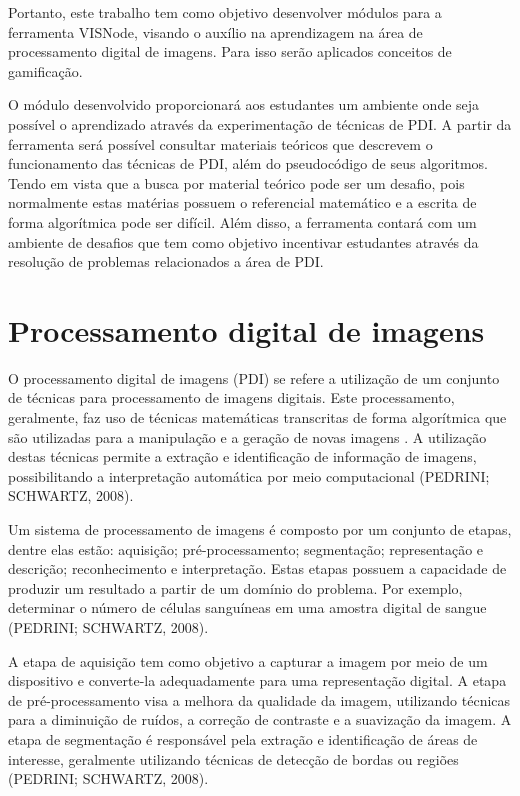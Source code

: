 \documentclass[
	12pt,				%
	oneside,			%
	a4paper,			%
	english,			%
	french,				%
	spanish,			%
	brazil,				%
	]{abntex2}
\begin{document}
Portanto, este trabalho tem como objetivo desenvolver módulos para a ferramenta VISNode, visando o auxílio na aprendizagem na área de processamento digital de imagens. Para isso serão aplicados conceitos de gamificação. 

O módulo desenvolvido proporcionará aos estudantes um ambiente onde seja possível o aprendizado através da experimentação de técnicas de PDI. A partir da ferramenta será possível consultar materiais teóricos que descrevem o funcionamento das técnicas de PDI, além do pseudocódigo de seus algoritmos. Tendo em vista que a busca por material teórico pode ser um desafio, pois normalmente estas matérias possuem o referencial matemático e a escrita de forma algorítmica pode ser difícil. Além disso, a ferramenta contará com um ambiente de desafios que tem como objetivo incentivar estudantes através da resolução de problemas relacionados a área de PDI.

\chapter{Processamento digital de imagens}

O  processamento digital de imagens (PDI) se refere a utilização de um conjunto de técnicas para processamento de imagens digitais. Este processamento, geralmente, faz uso de técnicas matemáticas transcritas de forma algorítmica que são utilizadas para a manipulação e a geração de novas imagens \cite{gonzalesWoods:2008}. A utilização destas técnicas permite a extração e identificação de informação de imagens, possibilitando a interpretação automática por meio computacional (PEDRINI; SCHWARTZ, 2008).

Um sistema de processamento de imagens é composto por um conjunto de etapas, dentre elas estão: aquisição; pré-processamento; segmentação; representação e descrição; reconhecimento e interpretação. Estas etapas possuem a capacidade de produzir um resultado a partir de um domínio do problema. Por exemplo, determinar o número de células sanguíneas em uma amostra digital de sangue (PEDRINI; SCHWARTZ, 2008).

A etapa de aquisição tem como objetivo a capturar a imagem por meio de um dispositivo e converte-la adequadamente para uma representação digital. A etapa de pré-processamento visa a melhora da qualidade da imagem, utilizando técnicas para a diminuição de ruídos, a correção de contraste e a suavização da imagem. A etapa de segmentação é responsável pela extração e identificação de áreas de interesse, geralmente utilizando técnicas de detecção de bordas ou regiões (PEDRINI; SCHWARTZ, 2008).
\end{document}
